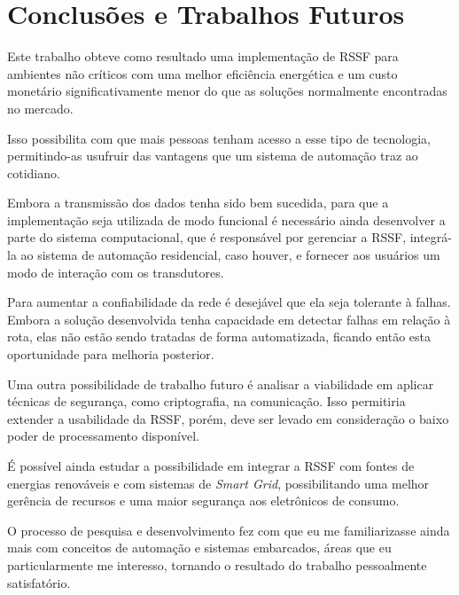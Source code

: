 \chapter{Conclusões e Trabalhos Futuros}
\label{cap:conclusao}
Este trabalho obteve como resultado uma implementação de RSSF para ambientes não críticos com uma melhor
eficiência energética e um custo monetário significativamente menor do que as soluções normalmente encontradas
no mercado.

Isso possibilita com que mais pessoas tenham acesso a esse tipo de tecnologia, permitindo-as usufruir das
vantagens que um sistema de automação traz ao cotidiano.

Embora a transmissão dos dados tenha sido bem sucedida, para que a implementação seja utilizada de modo
funcional é necessário ainda desenvolver a parte do sistema computacional, que é responsável por gerenciar a
RSSF, integrá-la ao sistema de automação residencial, caso houver, e fornecer aos usuários um modo de
interação com os transdutores.

Para aumentar a confiabilidade da rede é desejável que ela seja tolerante à falhas. Embora a solução
desenvolvida tenha capacidade em detectar falhas em relação à rota, elas não estão sendo tratadas de forma
automatizada, ficando então esta oportunidade para melhoria posterior.

Uma outra possibilidade de trabalho futuro é analisar a viabilidade em aplicar técnicas de segurança, como
criptografia, na comunicação. Isso permitiria extender a usabilidade da RSSF, porém, deve ser levado em
consideração o baixo poder de processamento disponível.

É possível ainda estudar a possibilidade em integrar a RSSF com fontes de energias renováveis e com sistemas
de \textit{Smart Grid}, possibilitando uma melhor gerência de recursos e uma maior segurança aos eletrônicos
de consumo.

O processo de pesquisa e desenvolvimento fez com que eu me familiarizasse ainda mais com conceitos de
automação e sistemas embarcados, áreas que eu particularmente me interesso, tornando o resultado do trabalho
pessoalmente satisfatório.
